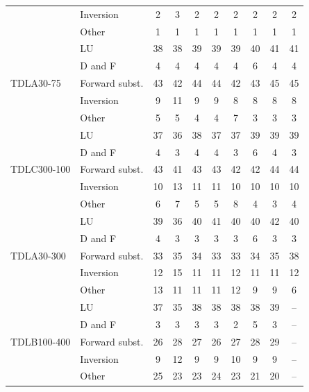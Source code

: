 \begin{table}[htbp]
\begin{tabular}{llcccccccc}
 & Inversion & 2 & 3 & 2 & 2 & 2 & 2 & 2 & 2 \\
 & Other & 1 & 1 & 1 & 1 & 1 & 1 & 1 & 1 \\
\midrule
\multirow{5}{*}{TDLA30-75} & LU & 38 & 38 & 39 & 39 & 39 & 40 & 41 & 41 \\
 & D and F & 4 & 4 & 4 & 4 & 4 & 6 & 4 & 4 \\
 & Forward subst. & 43 & 42 & 44 & 44 & 42 & 43 & 45 & 45 \\
 & Inversion & 9 & 11 & 9 & 9 & 8 & 8 & 8 & 8 \\
 & Other & 5 & 5 & 4 & 4 & 7 & 3 & 3 & 3 \\
\midrule
\multirow{5}{*}{TDLC300-100} & LU & 37 & 36 & 38 & 37 & 37 & 39 & 39 & 39 \\
 & D and F & 4 & 3 & 4 & 4 & 3 & 6 & 4 & 3 \\
 & Forward subst. & 43 & 41 & 43 & 43 & 42 & 42 & 44 & 44 \\
 & Inversion & 10 & 13 & 11 & 11 & 10 & 10 & 10 & 10 \\
 & Other & 6 & 7 & 5 & 5 & 8 & 4 & 3 & 4 \\
\midrule
\multirow{5}{*}{TDLA30-300} & LU & 39 & 36 & 40 & 41 & 40 & 40 & 42 & 40 \\
 & D and F & 4 & 3 & 3 & 3 & 3 & 6 & 3 & 3 \\
 & Forward subst. & 33 & 35 & 34 & 33 & 33 & 34 & 35 & 38 \\
 & Inversion & 12 & 15 & 11 & 11 & 12 & 11 & 11 & 12 \\
 & Other & 13 & 11 & 11 & 11 & 12 & 9 & 9 & 6 \\
\midrule
\multirow{5}{*}{TDLB100-400} & LU & 37 & 35 & 38 & 38 & 38 & 38 & 39 & -- \\
 & D and F & 3 & 3 & 3 & 3 & 2 & 5 & 3 & -- \\
 & Forward subst. & 26 & 28 & 27 & 26 & 27 & 28 & 29 & -- \\
 & Inversion & 9 & 12 & 9 & 9 & 10 & 9 & 9 & -- \\
 & Other & 25 & 23 & 23 & 24 & 23 & 21 & 20 & -- \\
\bottomrule
\end{tabular}
\vspace{4pt}
\end{table}

